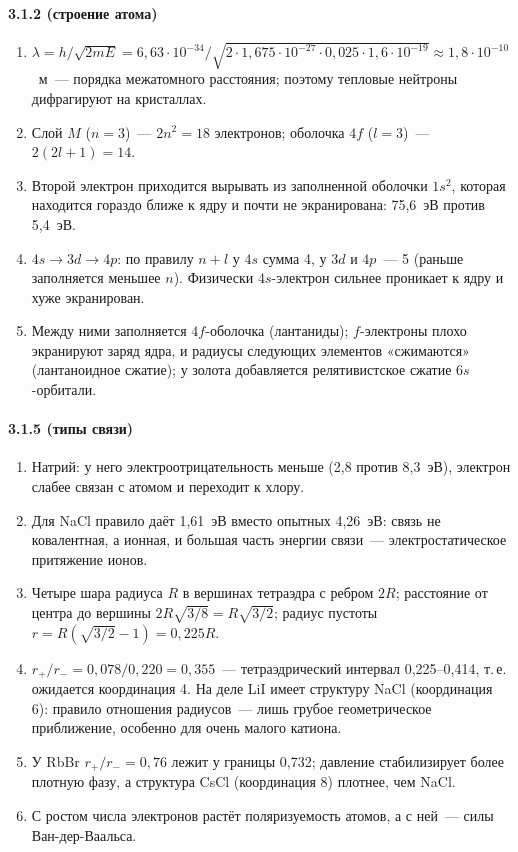 {\small
\paragraph{3.1.2 (строение атома)}
\begin{enumerate}[label=\arabic*.]
\item $\lambda=h/\sqrt{2mE}=6{,}63\cdot10^{-34}/\sqrt{2\cdot1{,}675\cdot10^{-27}\cdot0{,}025\cdot1{,}6\cdot10^{-19}}\approx1{,}8\cdot10^{-10}$~м~—
порядка межатомного расстояния; поэтому тепловые нейтроны дифрагируют
на кристаллах.
\item Слой $M$ ($n=3$)~— $2n^2=18$ электронов; оболочка $4f$ ($l=3$)~—
$2(2l+1)=14$.
\item Второй электрон приходится вырывать из заполненной оболочки
$1s^2$, которая находится гораздо ближе к ядру и почти не экранирована:
75,6~эВ против 5,4~эВ.
\item $4s\to3d\to4p$: по правилу $n+l$ у $4s$ сумма 4, у $3d$ и $4p$~— 5
(раньше заполняется меньшее $n$). Физически $4s$-электрон сильнее
проникает к ядру и хуже экранирован.
\item Между ними заполняется $4f$-оболочка (лантаниды); $f$-электроны
плохо экранируют заряд ядра, и радиусы следующих элементов «сжимаются»
(лантаноидное сжатие); у золота добавляется релятивистское сжатие
$6s$-орбитали.
\end{enumerate}

\paragraph{3.1.5 (типы связи)}
\begin{enumerate}[label=\arabic*.]
\item Натрий: у него электроотрицательность меньше (2,8 против 8,3~эВ),
электрон слабее связан с атомом и переходит к хлору.
\item Для NaCl правило даёт 1,61~эВ вместо опытных 4,26~эВ: связь не
ковалентная, а ионная, и большая часть энергии связи~— электростатическое
притяжение ионов.
\item Четыре шара радиуса $R$ в вершинах тетраэдра с ребром $2R$; расстояние
от центра до вершины $2R\sqrt{3/8}=R\sqrt{3/2}$; радиус пустоты
$r=R(\sqrt{3/2}-1)=0{,}225R$.
\item $r_+/r_-=0{,}078/0{,}220=0{,}355$~— тетраэдрический интервал
0,225--0,414, т.\,е. ожидается координация 4. На деле LiI имеет структуру
NaCl (координация 6): правило отношения радиусов~— лишь грубое
геометрическое приближение, особенно для очень малого катиона.
\item У RbBr $r_+/r_-=0{,}76$ лежит у границы 0,732; давление стабилизирует
более плотную фазу, а структура CsCl (координация 8) плотнее, чем NaCl.
\item С ростом числа электронов растёт поляризуемость атомов, а с ней~—
силы Ван-дер-Ваальса.
\end{enumerate}

}
